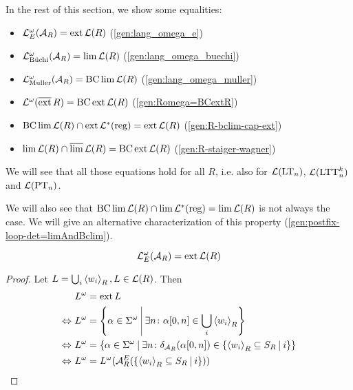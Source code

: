 In the rest of this section, we show some equalities:
\begin{itemize}
\item $\mathcal{L}^\omega_E(\mathcal{A}_R) = \operatorname{ext} \mathcal{L}(R)$ (\cref{gen:lang_omega_e})
\item $\mathcal{L}^\omega_{\text{Büchi}}(\mathcal{A}_R) = \lim \mathcal{L}(R)$ (\cref{gen:lang_omega_buechi})
\item $\mathcal{L}^\omega_{\text{Muller}}(\mathcal{A}_R) = \operatorname{BC} \lim \mathcal{L}(R)$ (\cref{gen:lang_omega_muller})
\item $\mathcal{L}^\omega(\operatorname{\overline{ext}} R) = \operatorname{BC} \operatorname{ext} \mathcal{L}(R)$ (\cref{gen:Romega=BCextR})
\item $\operatorname{BC} \lim \mathcal{L}(R) \cap \operatorname{ext} \mathcal{L}^*(\textup{\textrm{reg}}) = \operatorname{ext} \mathcal{L}(R)$ (\cref{gen:R-bclim-cap-ext})
\item $\lim \mathcal{L}(R) \cap \operatorname{\overline{lim}} \mathcal{L}(R) = \operatorname{BC} \operatorname{ext} \mathcal{L}(R)$ (\cref{gen:R-staiger-wagner})
\end{itemize}

We will see that all those equations hold for all $R$, i.e. also for $\mathcal{L}(\mathrm{LT}_n)$, $\mathcal{L}(\mathrm{LTT}^k_n)$ and $\mathcal{L}(\textup{\textrm{PT}}_n)$.

We will also see that $\operatorname{BC} \lim \mathcal{L}(R) \cap \lim \mathcal{L}^*(\textup{\textrm{reg}}) = \lim \mathcal{L}(R)$ is not always the case. We will give an alternative characterization of this property (\cref{gen:postfix-loop-det=limAndBclim}).

\begin{lemma}
\label{gen:lang_omega_e}
\[ \mathcal{L}^\omega_E(\mathcal{A}_R) = \operatorname{ext} \mathcal{L}(R) \]
\begin{proof}
Let $L = \bigcup_i \left< w_i\right>_R, L \in \mathcal{L}(R)$. Then
\begin{align*}
& L^\omega = \ext L \\
\Leftrightarrow \ & L^\omega = \Set{\alpha \in \Sigma^\omega}{\exists n \colon \alpha[0,n] \in \bigcup_i \left< w_i\right>_R} \\
\Leftrightarrow \ & L^\omega = \Set{\alpha \in \Sigma^\omega}{\exists n \colon \delta_{\A_R}(\alpha[0,n]) \in \Set{\left< w_i\right>_R \subseteq S_R}{i}} \\
\Leftrightarrow \ & L^\omega = L^\omega(\A^E_R(\Set{\left< w_i\right>_R \subseteq S_R}{i}))
\end{align*}
\end{proof}
\end{lemma}

